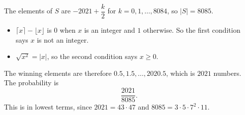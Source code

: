 The elements of $S$ are $-2021+\dfrac k2$ for $k=0,1,\dots,8084$, so $|S|=8085$.

\begin{itemize}
\item $\lceil x\rceil-\lfloor x\rfloor$ is $0$ when $x$ is an integer and $1$ otherwise. So the first condition says $x$ is not an integer.
\item $\sqrt{x^2}=|x|$, so the second condition says $x\ge0$.
\end{itemize}
The winning elements are therefore $0.5,1.5,\dots,2020.5$, which is $2021$ numbers. The probability is
\[\boxed{\dfrac{2021}{8085}}.\]
This is in lowest terms, since $2021=43\cdot47$ and $8085=3\cdot5\cdot7^2\cdot11$.
